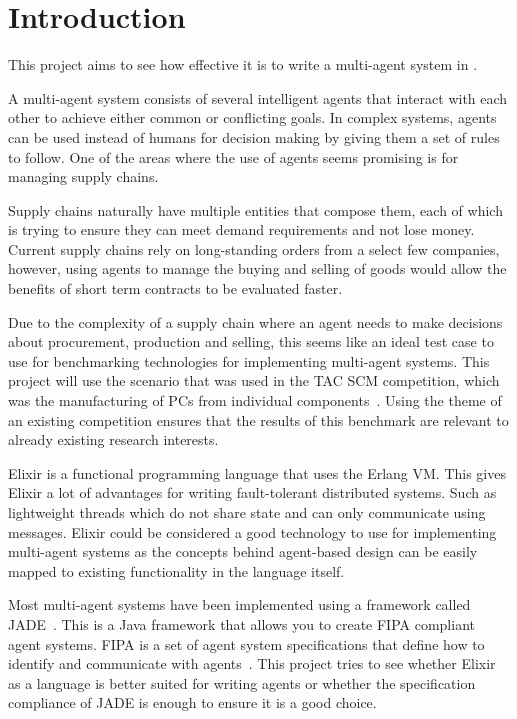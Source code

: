 \section{Introduction}

This project aims to see how effective it is to write a multi-agent system in .

A multi-agent system consists of several intelligent agents that interact with each other to achieve either common or conflicting goals.
In complex systems, agents can be used instead of humans for decision making by giving them a set of rules to follow.
One of the areas where the use of agents seems promising is for managing supply chains.

Supply chains naturally have multiple entities that compose them, each of which is trying to ensure they can meet demand requirements and not lose money.
Current supply chains rely on long-standing orders from a select few companies, however, using agents to manage the buying and selling of goods would allow the benefits of short term contracts to be evaluated faster.

Due to the complexity of a supply chain where an agent needs to make decisions about procurement, production and selling, this seems like an ideal test case to use for benchmarking technologies for implementing multi-agent systems.
This project will use the scenario that was used in the TAC SCM competition, which was the manufacturing of PCs from individual components~\cite{sadeh2003tac}.
Using the theme of an existing competition ensures that the results of this benchmark are relevant to already existing research interests.

Elixir is a functional programming language that uses the Erlang VM\@.
This gives Elixir a lot of advantages for writing fault-tolerant distributed systems.
Such as lightweight threads which do not share state and can only communicate using messages.
Elixir could be considered a good technology to use for implementing multi-agent systems as the concepts behind agent-based design can be easily mapped to existing functionality in the language itself.

Most multi-agent systems have been implemented using a framework called JADE~\cite{bellifemine1999jade}.
This is a Java framework that allows you to create FIPA compliant agent systems.
FIPA is a set of agent system specifications that define how to identify and communicate with agents~\cite{obrien1998fipa}.
This project tries to see whether Elixir as a language is better suited for writing agents or whether the specification compliance of JADE is enough to ensure it is a good choice.

